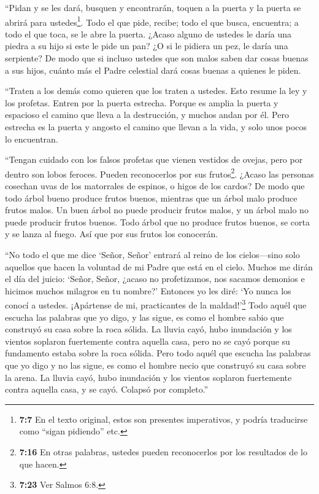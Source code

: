  ``Pidan y se les dará, busquen y encontrarán, toquen a la
puerta y la puerta se abrirá para ustedes\footnote{\textbf{7:7} En el
  texto original, estos son presentes imperativos, y podría traducirse
  como ``sigan pidiendo'' etc.}.  Todo el que pide, recibe;
todo el que busca, encuentra; a todo el que toca, se le abre la puerta.
 ¿Acaso alguno de ustedes le daría una piedra a su hijo si
este le pide un pan?  ¿O si le pidiera un pez, le daría una
serpiente?  De modo que si incluso ustedes que son malos
saben dar cosas buenas a sus hijos, cuánto más el Padre celestial dará
cosas buenas a quienes le piden.

 ``Traten a los demás como quieren que los traten a
ustedes. Esto resume la ley y los profetas.  Entren por la
puerta estrecha. Porque es amplia la puerta y espacioso el camino que
lleva a la destrucción, y muchos andan por él.  Pero
estrecha es la puerta y angosto el camino que llevan a la vida, y solo
unos pocos lo encuentran.

 ``Tengan cuidado con los falsos profetas que vienen
vestidos de ovejas, pero por dentro son lobos feroces. 
Pueden reconocerlos por sus frutos\footnote{\textbf{7:16} En otras
  palabras, ustedes pueden reconocerlos por los resultados de lo que
  hacen.}. ¿Acaso las personas cosechan uvas de los matorrales de
espinos, o higos de los cardos?  De modo que todo árbol
bueno produce frutos buenos, mientras que un árbol malo produce frutos
malos.  Un buen árbol no puede producir frutos malos, y un
árbol malo no puede producir frutos buenos.  Todo árbol que
no produce frutos buenos, se corta y se lanza al fuego. 
Así que por sus frutos los conocerán.

 ``No todo el que me dice `Señor, Señor' entrará al reino
de los cielos---sino solo aquellos que hacen la voluntad de mi Padre que
está en el cielo.  Muchos me dirán el día del juicio:
`Señor, Señor, ¿acaso no profetizamos, nos sacamos demonios e hicimos
muchos milagros en tu nombre?'  Entonces yo les diré: `Yo
nunca los conocí a ustedes. ¡Apártense de mi, practicantes de la
maldad!'\footnote{\textbf{7:23} Ver Salmos 6:8.}  Todo
aquél que escucha las palabras que yo digo, y las sigue, es como el
hombre sabio que construyó su casa sobre la roca sólida. 
La lluvia cayó, hubo inundación y los vientos soplaron fuertemente
contra aquella casa, pero no se cayó porque su fundamento estaba sobre
la roca sólida.  Pero todo aquél que escucha las palabras
que yo digo y no las sigue, es como el hombre necio que construyó su
casa sobre la arena.  La lluvia cayó, hubo inundación y los
vientos soplaron fuertemente contra aquella casa, y se cayó. Colapsó por
completo.''

